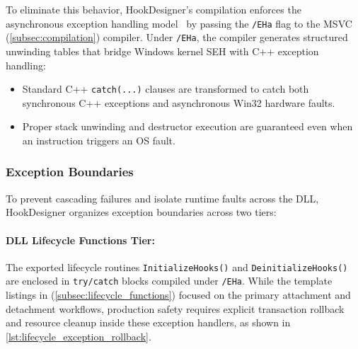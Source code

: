 To eliminate this behavior, HookDesigner's compilation enforces the asynchronous exception handling model~\cite{doc:msvc_eh} by passing the \texttt{/EHa} flag to the MSVC (\cref{subsec:compilation}) compiler.
Under \texttt{/EHa}, the compiler generates structured unwinding tables that bridge Windows kernel \ac{SEH} with C++ exception handling:
\begin{itemize}
	\item Standard C++ \texttt{catch(...)} clauses are transformed to catch both synchronous C++ exceptions and asynchronous Win32 hardware faults.
	\item Proper stack unwinding and destructor execution are guaranteed even when an instruction triggers an OS fault.
\end{itemize}

\subsubsection{Exception Boundaries}

To prevent cascading failures and isolate runtime faults across the DLL, HookDesigner organizes exception boundaries across two tiers:

\paragraph{DLL Lifecycle Functions Tier:}
The exported lifecycle routines \texttt{InitializeHooks()} and \texttt{DeinitializeHooks()} are enclosed in \texttt{try/catch} blocks compiled under \texttt{/EHa}.
While the template listings in (\cref{subsec:lifecycle_functions}) focused on the primary attachment and detachment workflows, production safety requires explicit transaction rollback and resource cleanup inside these exception handlers, as shown in \cref{lst:lifecycle_exception_rollback}.

